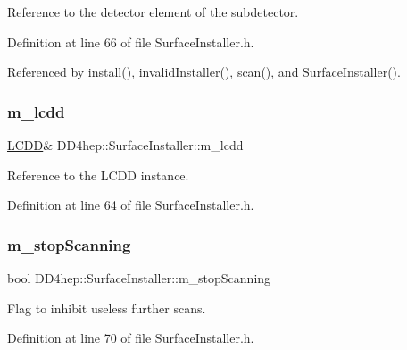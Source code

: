 Reference to the detector element of the subdetector. 



Definition at line 66 of file Surface\+Installer.\+h.



Referenced by install(), invalid\+Installer(), scan(), and Surface\+Installer().

\hypertarget{class_d_d4hep_1_1_surface_installer_a557d1f8fd057ae637f855dca603ebaf9}{}\label{class_d_d4hep_1_1_surface_installer_a557d1f8fd057ae637f855dca603ebaf9} 
\subsubsection{\texorpdfstring{m\+\_\+lcdd}{m\_lcdd}}
{\footnotesize\ttfamily \hyperlink{class_d_d4hep_1_1_surface_installer_a155d137884c31b56d13fb58846e562a3}{L\+C\+DD}\& D\+D4hep\+::\+Surface\+Installer\+::m\+\_\+lcdd\hspace{0.3cm}{\ttfamily [protected]}}



Reference to the L\+C\+DD instance. 



Definition at line 64 of file Surface\+Installer.\+h.

\hypertarget{class_d_d4hep_1_1_surface_installer_ab8193ffcef2d5b522aba8d594a2da412}{}\label{class_d_d4hep_1_1_surface_installer_ab8193ffcef2d5b522aba8d594a2da412} 
\subsubsection{\texorpdfstring{m\+\_\+stop\+Scanning}{m\_stopScanning}}
{\footnotesize\ttfamily bool D\+D4hep\+::\+Surface\+Installer\+::m\+\_\+stop\+Scanning\hspace{0.3cm}{\ttfamily [protected]}}



Flag to inhibit useless further scans. 



Definition at line 70 of file Surface\+Installer.\+h.




